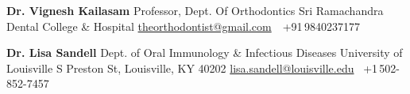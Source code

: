 \documentclass[letterpaper,MMMyyyy,nonstopmode]{simpleresumecv}
\newcommand{\Code}[1]{\mbox{\textbf{#1}}}
\newcommand{\CodeCommand}[1]{\mbox{\textbf{\textbackslash{#1}}}}
\begin{document}
\begin{Body}
 \BulletItem
 \textbf{Dr. Vignesh Kailasam}
 \newline
 Professor, Dept. Of Orthodontics
 \newline
 Sri Ramachandra Dental College \& Hospital
 \newline
 \href{mailto:theorthodontist@gmail.com}
 {theorthodontist@gmail.com}
 \,\SubBulletSymbol\,
 +91\,9840237177

 \BigGap
 \BulletItem
 \textbf{Dr. Lisa Sandell}
 \newline
  Dept. of Oral Immunology \& Infectious Diseases
 \newline
 University of Louisville
  S Preston St, Louisville, KY 40202
 \newline
 \href{mailto:lisa.sandell@louisville.edu}
 {lisa.sandell@louisville.edu}
 \SubBulletSymbol\,
+1\,502-852-7457









\end{Body}
\end{document}
